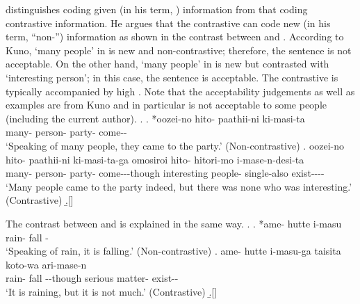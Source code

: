  distinguishes  coding given (in his term, ) information
from that coding contrastive information.
He argues that the contrastive  can code new (in his term, ``non-'') information
as shown in the contrast between \Next[a] and \Next[b].
According to Kuno,
 `many people' in \Next[a] is new and non-contrastive;
therefore, the sentence is not acceptable.
On the other hand,  `many people' in \Next[b] is new but contrasted with  `interesting person';
in this case, the sentence is acceptable.
The contrastive  is typically accompanied by high .
Note that the acceptability judgements as well as examples are from Kuno and
in particular \Next[b] is not acceptable to some people (including the current author).
%
\ex.
 \ag. *oozei-no hito- paathii-ni ki-masi-ta \\
       many- person- party- come-- \\
       `Speaking of many people, they came to the party.'
       \hfill{(Non-contrastive)}
 \bg. oozei-no hito- paathii-ni ki-masi-ta-ga omosiroi hito- hitori-mo i-mase-n-desi-ta \\
       many- person- party- come---though interesting people- single-also exist---- \\
       `Many people came to the party indeed, but there was none who was interesting.'
       \hfill{(Contrastive)}
 \b.[] \hfill{\cite[47]{kuno73}}

The contrast between \Next[a] and \Next[b] is explained in the same way.
\ex.
 \ag. *ame- hutte i-masu \\
       rain- fall - \\
       `Speaking of rain, it is falling.'
       \hfill{(Non-contrastive)}
 \bg. ame- hutte i-masu-ga taisita koto-wa ari-mase-n \\
       rain- fall --though serious matter- exist-- \\
       `It is raining, but it is not much.'
       \hfill{(Contrastive)}
 \b.[] \hfill{\cite[46]{kuno73}}
%

